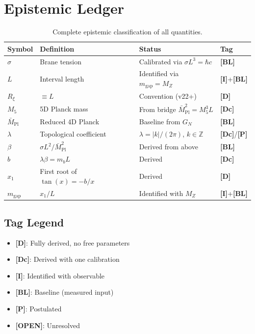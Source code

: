 \documentclass[11pt,a4paper]{article}
\newcommand{\Mpl}{\bar{M}_{\mathrm{Pl}}}
\newcommand{\Mfive}{M_5}
\newcommand{\Rxi}{R_\xi}
\newcommand{\mgap}{m_{\mathrm{gap}}}
\newcommand{\mb}{m_b}
\newcommand{\MZ}{M_Z}
\newcommand{\tagD}{\textbf{[D]}}
\newcommand{\tagDc}{\textbf{[Dc]}}
\newcommand{\tagI}{\textbf{[I]}}
\newcommand{\tagBL}{\textbf{[BL]}}
\newcommand{\tagP}{\textbf{[P]}}
\newcommand{\tagOPEN}{\textbf{[OPEN]}}
\theoremstyle{definition}
\theoremstyle{plain}
\theoremstyle{remark}
\begin{document}
\section{Epistemic Ledger}
\label{sec:ledger}

\begin{table}[htbp]
\centering
\caption{Complete epistemic classification of all quantities.}
\label{tab:ledger}
\begin{tabular}{@{}llll@{}}
\toprule
Symbol & Definition & Status & Tag \\
\midrule
$\sigma$ & Brane tension & Calibrated via $\sigma L^3 = \hbar c$ & \tagBL{} \\
$L$ & Interval length & Identified via $\mgap = \MZ$ & \tagI{}+\tagBL{} \\
$\Rxi$ & $\equiv L$ & Convention (v22+) & \tagD{} \\
$\Mfive$ & 5D Planck mass & From bridge $\Mpl^2 = \Mfive^3 L$ & \tagDc{} \\
$\Mpl$ & Reduced 4D Planck & Baseline from $G_N$ & \tagBL{} \\
$\lambda$ & Topological coefficient & $\lambda = |k|/(2\pi)$, $k \in \mathbb{Z}$ & \tagDc{}/\tagP{} \\
$\beta$ & $\sigma L^2/\Mpl^2$ & Derived from above & \tagBL{} \\
$b$ & $\lambda\beta = \mb L$ & Derived & \tagDc{} \\
$x_1$ & First root of $\tan(x) = -b/x$ & Derived & \tagD{} \\
$\mgap$ & $x_1/L$ & Identified with $\MZ$ & \tagI{}+\tagBL{} \\
\bottomrule
\end{tabular}
\end{table}

\subsection{Tag Legend}

\begin{itemize}
\item \tagD{}: Fully derived, no free parameters
\item \tagDc{}: Derived with one calibration
\item \tagI{}: Identified with observable
\item \tagBL{}: Baseline (measured input)
\item \tagP{}: Postulated
\item \tagOPEN{}: Unresolved
\end{itemize}
\end{document}
